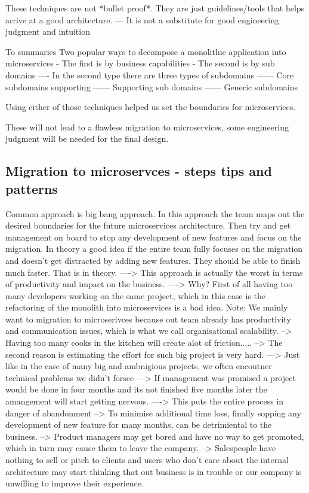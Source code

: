 \documentclass[a4paper, 11pt]{book}
\begin{document}
{    These techniques are not *bullet proof*. They are just guidelines/tools that helps arrive at a good architecture.
    --- It is not a substitute for good engineering judgment and intuition

    To summaries
    Two popular ways to decompose a monolithic application into microservices
    - The first is by business capabilities
    - The second is by sub domains
    ---- In the second type there are three types of subdomains
    ------ Core subdomains supporting
    ------ Supporting sub domains
    ------ Generic subdomains

    Using either of those techniques helped us set the boundaries for microserviecs.

    These will not lead to a flawless migration to microservices, some engineering judgment will be needed for the final design.

    \subsection{Migration to microservces - steps tips and patterns}
    Common approach is big bang approach.
    In this approach the team maps out the desired boundaries for the future microservices architecture.
    Then try and get management on board to stop any development of new features and focus on the migration.
    In theory a good idea if the entire team fully focuses on the migration and doesn't get distracted by adding new features. They should be able to finish much faster.
    That is in theory.
    ----> This approach is actually the worst in terms of productivity and impact on the business.
    ----> Why?
    First of all having too many developers working on the same project, which in this case is the refactoring of the monolith into microservices is a bad idea.
    Note: We mainly want to migration to microserivces because out team already has productivity and communication issues, which is what we call organisational scalability.
    --> Having too many cooks in the kitchen will create alot of friction.....
    --> The second reason is estimating the effort for such big project is very hard.
    ---> Just like in the case of many big and ambnigious projects, we often encoutner technical problems we didn't forsee
    ---> If management was promised a project would be done in four months and its not finished five months later the amangement will start getting nervous.
    ----> This puts the entire process in danger of abandonment
    --> To minimise additional time loss, finally sopping any development of new feature for many months, can be detrimiental to the business.
    --> Product managers may get bored and have no way to get promoted, which in turn may cause them to leave the company.
    --> Salespeople have nothing to sell or pitch to clients and users who don't care about the internal architecture may start thinking that out business is in trouble or our company is unwilling to improve their experience.

}
\end{document}
